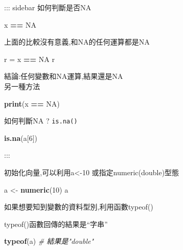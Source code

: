 \documentclass[]{book}
\newenvironment{Shaded}{\begin{snugshade}}{\end{snugshade}}
\newcommand{\KeywordTok}[1]{\textcolor[rgb]{0.13,0.29,0.53}{\textbf{#1}}}
\newcommand{\DecValTok}[1]{\textcolor[rgb]{0.00,0.00,0.81}{#1}}
\newcommand{\StringTok}[1]{\textcolor[rgb]{0.31,0.60,0.02}{#1}}
\newcommand{\CommentTok}[1]{\textcolor[rgb]{0.56,0.35,0.01}{\textit{#1}}}
\newcommand{\OtherTok}[1]{\textcolor[rgb]{0.56,0.35,0.01}{#1}}
\newcommand{\OperatorTok}[1]{\textcolor[rgb]{0.81,0.36,0.00}{\textbf{#1}}}
\newcommand{\NormalTok}[1]{#1}
\theoremstyle{definition}
\theoremstyle{definition}
\theoremstyle{definition}
\theoremstyle{remark}
\begin{document}
::: sidebar 如何判斷是否NA

\begin{Shaded}
\begin{Highlighting}[]
\NormalTok{x }\OperatorTok{==}\StringTok{ }\OtherTok{NA}
\end{Highlighting}
\end{Shaded}

上面的比較沒有意義,和NA的任何運算都是NA

\begin{Shaded}
\begin{Highlighting}[]
\NormalTok{r =}\StringTok{ }\NormalTok{x }\OperatorTok{==}\StringTok{ }\OtherTok{NA}
\NormalTok{r}
\end{Highlighting}
\end{Shaded}

結論:任何變數和NA運算,結果還是NA\\
另一種方法

\begin{Shaded}
\begin{Highlighting}[]
\KeywordTok{print}\NormalTok{(x }\OperatorTok{==}\StringTok{ }\OtherTok{NA}\NormalTok{)}
\end{Highlighting}
\end{Shaded}

如何判斷NA ? \texttt{is.na()}

\begin{Shaded}
\begin{Highlighting}[]
    \KeywordTok{is.na}\NormalTok{(a[}\DecValTok{6}\NormalTok{])}
\end{Highlighting}
\end{Shaded}

:::

初始化向量,可以利用a\textless{}-10 或指定numeric(double)型態

\begin{Shaded}
\begin{Highlighting}[]
\NormalTok{a <-}\StringTok{ }\KeywordTok{numeric}\NormalTok{(}\DecValTok{10}\NormalTok{) }
\NormalTok{a}
\end{Highlighting}
\end{Shaded}

如果想要知到變數的資料型別,利用函數typeof()

typeof()函數回傳的結果是``字串''

\begin{Shaded}
\begin{Highlighting}[]
\KeywordTok{typeof}\NormalTok{(a) }\CommentTok{# 結果是"double"}
\end{Highlighting}
\end{Shaded}
\end{document}
